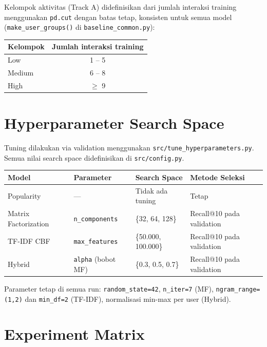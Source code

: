 \documentclass[10pt,a4paper]{article}
\begin{document}
Kelompok aktivitas (Track A) didefinisikan dari jumlah interaksi training menggunakan \texttt{pd.cut}
dengan batas tetap, konsisten untuk semua model (\texttt{make\_user\_groups()} di \texttt{baseline\_common.py}):

\begin{table}[h!]
\centering
\begin{tabular}{@{}lc@{}}
\toprule
\textbf{Kelompok} & \textbf{Jumlah interaksi training} \\
\midrule
Low    & 1 -- 5   \\
Medium & 6 -- 8   \\
High   & $\geq$ 9 \\
\bottomrule
\end{tabular}
\end{table}

\section{Hyperparameter Search Space}

Tuning dilakukan via validation menggunakan \texttt{src/tune\_hyperparameters.py}.
Semua nilai search space didefinisikan di \texttt{src/config.py}.

\begin{table}[h!]
\centering
\begin{tabular}{@{}llll@{}}
\toprule
\textbf{Model} & \textbf{Parameter} & \textbf{Search Space} & \textbf{Metode Seleksi} \\
\midrule
Popularity        & ---                & Tidak ada tuning    & Tetap \\
Matrix Factorization & \texttt{n\_components} & \{32, 64, 128\}     & Recall@10 pada validation \\
TF-IDF CBF        & \texttt{max\_features}  & \{50.000, 100.000\} & Recall@10 pada validation \\
Hybrid            & \texttt{alpha} (bobot MF) & \{0.3, 0.5, 0.7\}  & Recall@10 pada validation \\
\bottomrule
\end{tabular}
\end{table}

Parameter tetap di semua run: \texttt{random\_state=42}, \texttt{n\_iter=7} (MF),
\texttt{ngram\_range=(1,2)} dan \texttt{min\_df=2} (TF-IDF), normalisasi min-max per user (Hybrid).

\section{Experiment Matrix}
\end{document}

